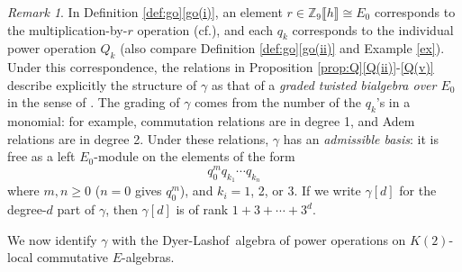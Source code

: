 \documentclass{gtpart}
\theoremstyle{definition}
\theoremstyle{remark}
\newtheorem{rmk}[thm]{Remark}
\newcommand{\mb}[1]{\mathbb{#1}}
\newcommand{\cf}{cf.\thinspace}
\newcommand{\DL}{Dyer-Lashof~}
\newcommand{\BZ}{{\mb Z}}
\newcommand{\g}{\gamma}
\newcommand{\q}[1]{Proposition \ref{prop:Q}\thinspace \eqref{Q(#1)}}
\newcommand{\go}[1]{Definition \ref{def:go}\thinspace \eqref{go(#1)}}
\begin{document}
\begin{rmk}
\label{rmk:rank}
 In \go{i}, an element $r \in \BZ_9 \llbracket h \rrbracket \cong E_0$ 
 corresponds to the multiplication-by-$r$ operation (\cf \cite[Proposition 6.4]{cong}), 
 and each $q_k$ corresponds to the individual power operation $Q_k$ (also compare \go{ii} and Example \ref{ex}).  
 Under this correspondence, the relations in \q{ii}-\eqref{Q(v)}  describe explicitly the structure of $\g$ as 
 that of a {\em graded twisted bialgebra over $E_0$} in the sense of \cite[Section 5]{cong}.  
 The grading of $\g$ comes from the number of the $q_k$'s in a monomial: for example, commutation relations are in degree 1, and Adem relations are in degree 2.  
 Under these relations, $\g$ has an {\em admissible basis}: it is free as a left $E_0$-module on the elements of the form 
 \[
  q_0^m q_{k_1} \cdots q_{k_n} 
 \]
 where $m, n \geq 0$ ($n = 0$ gives $q_0^m$), and $k_i = 1$, 2, or 3.  
 If we write $\g[d]$ for the degree-$d$ part of $\g$, then $\g[d]$ is of rank $1 + 3 + \cdots + 3^d$.  
\end{rmk}

We now identify $\g$ with the \DL algebra of power operations on $K(2)$-local commutative $E$-algebras.  
\end{document}
